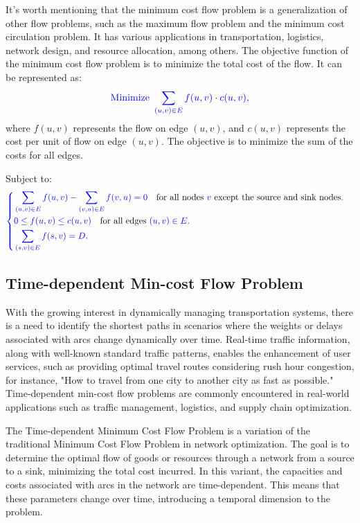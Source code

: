 \documentclass[a4paper]{article}
\begin{document}
		It's worth mentioning that the minimum cost flow problem is a generalization of other flow problems, such as the maximum flow problem and the minimum cost circulation problem. It has various applications in transportation, logistics, network design, and resource allocation, among others.
		The objective function of the minimum cost flow problem is to minimize the total cost of the flow. It can be represented as:
		\[\textcolor{blue}{
		\text{Minimize } \sum_{(u, v) \in E} f(u, v) \cdot c(u, v),}
		\]
		where \(f(u, v)\) represents the flow on edge \((u, v)\), and \(c(u, v)\) represents the cost per unit of flow on edge \((u, v)\). The objective is to minimize the sum of the costs for all edges.
		
		Subject to:
		\[
		\textcolor{blue}{
			\begin{cases}
				\begin{aligned}
					& \sum_{(u, v) \in E} f(u, v) - \sum_{(v, u) \in E} f(v, u) = 0 \quad \textcolor{black}{\text{for all nodes }} v \textcolor{black}{\text{ except the source and sink nodes.}} \\
					& 0 \leq f(u, v) \leq c(u, v) \quad \textcolor{black}{\text{for all edges }} (u, v) \in E. \\
					& \sum_{(s, v) \in E} f(s, v) = D.
				\end{aligned}
			\end{cases}
		}
		\]
		
		
		\subsection{Time-dependent Min-cost Flow Problem}
		With the growing interest in dynamically managing transportation systems, there is a need to identify the shortest paths in scenarios where the weights or delays associated with arcs change dynamically over time. Real-time traffic information, along with well-known standard traffic patterns, enables the enhancement of user services, such as providing optimal travel routes considering rush hour congestion, for instance, "How to travel from one city to another city as fast as possible." Time-dependent min-cost flow problems are commonly encountered in real-world applications such as traffic management, logistics, and supply chain optimization.
		
		The Time-dependent Minimum Cost Flow Problem is a variation of the traditional Minimum Cost Flow Problem in network optimization. The goal is to determine the optimal flow of goods or resources through a network from a source to a sink, minimizing the total cost incurred. In this variant, the capacities and costs associated with arcs in the network are time-dependent. This means that these parameters change over time, introducing a temporal dimension to the problem.
		
\end{document}
